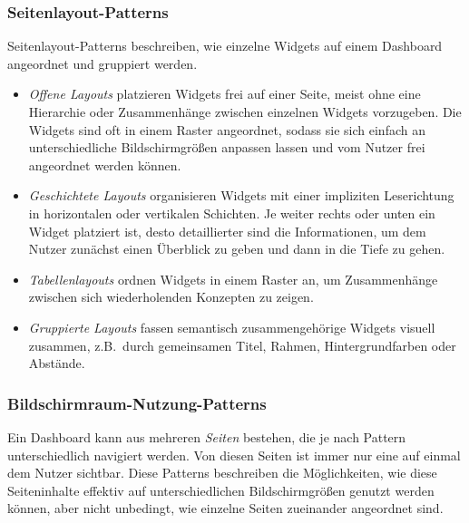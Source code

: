 \subsubsection{Seitenlayout-Patterns}

Seitenlayout-Patterns beschreiben, wie einzelne Widgets auf einem Dashboard angeordnet und gruppiert werden.

\begin{itemize}
    \item \emph{Offene Layouts} platzieren Widgets frei auf einer Seite, meist ohne eine Hierarchie oder Zusammenhänge zwischen einzelnen Widgets vorzugeben.
    Die Widgets sind oft in einem Raster angeordnet, sodass sie sich einfach an unterschiedliche Bildschirmgrößen anpassen lassen und vom Nutzer frei angeordnet werden können.
    \item \emph{Geschichtete Layouts} organisieren Widgets mit einer impliziten Leserichtung in horizontalen oder vertikalen Schichten.
    Je weiter rechts oder unten ein Widget platziert ist, desto detaillierter sind die Informationen, um dem Nutzer zunächst einen Überblick zu geben und dann in die Tiefe zu gehen.
    \item \emph{Tabellenlayouts} ordnen Widgets in einem Raster an, um Zusammenhänge zwischen sich wiederholenden Konzepten zu zeigen.
    \item \emph{Gruppierte Layouts} fassen semantisch zusammengehörige Widgets visuell zusammen, z.B.\ durch gemeinsamen Titel, Rahmen, Hintergrundfarben oder Abstände.
\end{itemize}

\subsubsection{Bildschirmraum-Nutzung-Patterns}

Ein Dashboard kann aus mehreren \emph{Seiten} bestehen, die je nach Pattern unterschiedlich navigiert werden.
Von diesen Seiten ist immer nur eine auf einmal dem Nutzer sichtbar.
Diese Patterns beschreiben die Möglichkeiten, wie diese Seiteninhalte effektiv auf unterschiedlichen Bildschirmgrößen genutzt werden können, aber nicht unbedingt, wie einzelne Seiten zueinander angeordnet sind.

